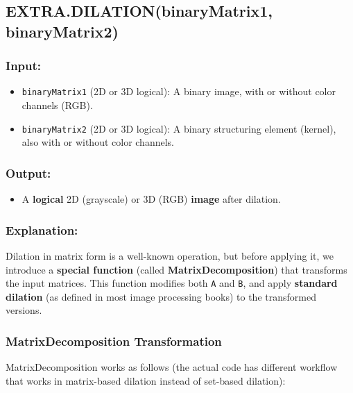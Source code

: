 \documentclass[11pt]{amsart}
\theoremstyle{remark}
\providecommand{\tightlist}{%
  \setlength{\itemsep}{0pt}\setlength{\parskip}{0pt}}
\theoremstyle{definition}
\theoremstyle{remark}
\numberwithin{equation}{section}
\begin{document}
\subsection{EXTRA.DILATION(binaryMatrix1,
binaryMatrix2)}\label{extra.dilationbinarymatrix1-binarymatrix2}

\subsubsection{Input:}\label{input}

\begin{itemize}
\tightlist
\item
  \texttt{binaryMatrix1} (2D or 3D logical): A binary image, with or
  without color channels (RGB).
\item
  \texttt{binaryMatrix2} (2D or 3D logical): A binary structuring
  element (kernel), also with or without color channels.
\end{itemize}

\subsubsection{Output:}\label{output}

\begin{itemize}
\tightlist
\item
  A \textbf{logical} 2D (grayscale) or 3D (RGB) \textbf{image} after
  dilation.
\end{itemize}

\subsubsection{Explanation:}\label{explanation}

Dilation in matrix form is a well-known operation, but before applying
it, we introduce a \textbf{special function} (called
\textbf{MatrixDecomposition}) that transforms the input matrices. This
function modifies both \texttt{A} and \texttt{B}, and apply
\textbf{standard dilation} (as defined in most image processing books)
to the transformed versions.

\subsubsection{MatrixDecomposition
Transformation}\label{matrixdecomposition-transformation}

MatrixDecomposition works as follows (the actual code has different
workflow that works in matrix-based dilation instead of set-based
dilation):
\end{document}
